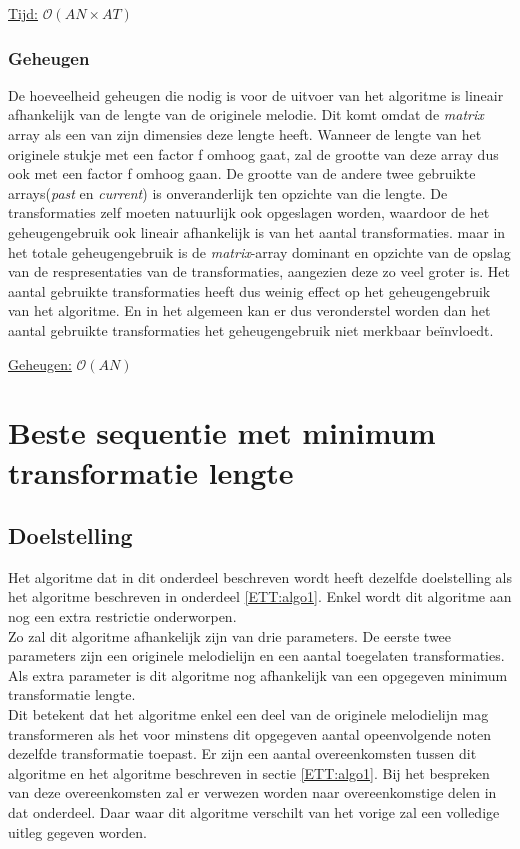 \begin{center}
\underline{Tijd:} $\mathcal{O}(AN \times AT)$
\end{center}

\subsubsection{Geheugen}
De hoeveelheid geheugen die nodig is voor de uitvoer van het algoritme is lineair afhankelijk van de lengte van de originele melodie. Dit komt omdat de \textit{matrix} array als een van zijn dimensies deze lengte heeft. Wanneer de lengte van het originele stukje met een factor f omhoog gaat, zal de grootte van deze array dus ook met een factor f omhoog gaan. De grootte van de andere twee gebruikte arrays(\textit{past} en \textit{current}) is onveranderlijk ten opzichte van die lengte. De transformaties zelf moeten natuurlijk ook opgeslagen worden, waardoor de het geheugengebruik ook lineair afhankelijk is van het aantal transformaties. maar in het totale geheugengebruik is de \textit{matrix}-array dominant en opzichte van de opslag van de respresentaties van de transformaties, aangezien deze zo veel groter is. Het aantal gebruikte transformaties heeft dus weinig effect op het geheugengebruik van het algoritme. En in het algemeen kan er dus veronderstel worden dan het aantal gebruikte transformaties het geheugengebruik niet merkbaar be\"invloedt.

\begin{center}
\underline{Geheugen:} $\mathcal{O}(AN)$
\end{center}

\section{Beste sequentie met minimum transformatie lengte}
\label{ETT:algo2}

\subsection{Doelstelling}
Het algoritme dat in dit onderdeel beschreven wordt heeft dezelfde doelstelling als het algoritme beschreven in onderdeel \ref{ETT:algo1}. Enkel wordt dit algoritme aan nog een extra restrictie onderworpen.\\ 
Zo zal dit algoritme afhankelijk zijn van drie parameters. De eerste twee parameters zijn een originele melodielijn en een aantal toegelaten transformaties. Als extra parameter is dit algoritme nog afhankelijk van een opgegeven minimum transformatie lengte.\\ 
Dit betekent dat het algoritme enkel een deel van de originele melodielijn mag transformeren als het voor minstens dit opgegeven aantal opeenvolgende noten dezelfde transformatie toepast. Er zijn een aantal overeenkomsten tussen dit algoritme en het algoritme beschreven in sectie \ref{ETT:algo1}. Bij het bespreken van deze overeenkomsten zal er verwezen worden naar overeenkomstige delen in dat onderdeel. Daar waar dit algoritme verschilt van het vorige zal een volledige uitleg gegeven worden.

